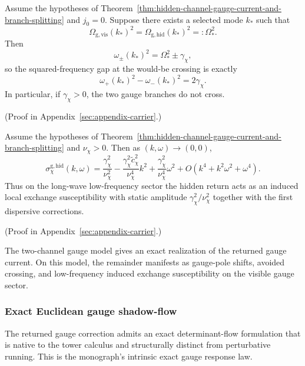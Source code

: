 \begin{corollary}
\label{cor:exact-avoided-crossing-coupled-gauge-branches}
Assume the hypotheses of
Theorem~\ref{thm:hidden-channel-gauge-current-and-branch-splitting} and
\(j_0=0\). Suppose there exists a selected mode \(k_\ast\) such that
\[
\Omega_{\mathrm{g,vis}}(k_\ast)^2
=
\Omega_{\mathrm{g,hid}}(k_\ast)^2
=:
\Omega_{\ast}^2.
\]
Then
\[
\omega_{\pm}(k_\ast)^2=\Omega_{\ast}^2\pm\gamma_{\chi},
\]
so the squared-frequency gap at the would-be crossing is exactly
\[
\omega_+(k_\ast)^2-\omega_-(k_\ast)^2=2\gamma_{\chi}.
\]
In particular, if \(\gamma_{\chi}>0\), the two gauge branches do not cross.
\end{corollary}

(Proof in Appendix~\ref{sec:appendix-carrier}.)

\begin{corollary}
\label{cor:low-frequency-induced-exchange-susceptibility}
Assume the hypotheses of
Theorem~\ref{thm:hidden-channel-gauge-current-and-branch-splitting} and
\(\nu_{\chi}>0\). Then as \((k,\omega)\to(0,0)\),
\[
\sigma_{\chi}^{\mathrm{g,hid}}(k,\omega)
=
\frac{\gamma_{\chi}^2}{\nu_{\chi}^2}
-
\frac{\gamma_{\chi}^2\widetilde c_{\chi}^2}{\nu_{\chi}^4}k^2
+
\frac{\gamma_{\chi}^2}{\nu_{\chi}^4}\omega^2
+
O(k^4+k^2\omega^2+\omega^4).
\]
Thus on the long-wave low-frequency sector the hidden return acts as an
induced local exchange susceptibility with static amplitude
\(\gamma_{\chi}^2/\nu_{\chi}^2\) together with the first dispersive
corrections.
\end{corollary}

(Proof in Appendix~\ref{sec:appendix-carrier}.)

The two-channel gauge model gives an exact realization of the returned gauge
current. On this model, the remainder manifests as gauge-pole shifts, avoided
crossing, and low-frequency induced exchange susceptibility on the visible
gauge sector.

\subsubsection{Exact Euclidean gauge shadow-flow}

The returned gauge correction admits an exact determinant-flow formulation
that is native to the tower calculus and structurally distinct from perturbative
running. This is the monograph's intrinsic exact gauge response law.

